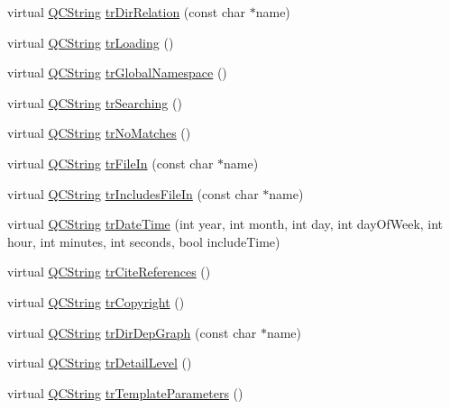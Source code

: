 \begin{DoxyCompactItemize}
\item 
virtual \hyperlink{class_q_c_string}{Q\-C\-String} \hyperlink{class_translator_italian_a38a56cc8bcc5323be9d1f09b0daa5933}{tr\-Dir\-Relation} (const char $\ast$name)
\item 
virtual \hyperlink{class_q_c_string}{Q\-C\-String} \hyperlink{class_translator_italian_aca8cf7409bceb9f8e6af47f637da5457}{tr\-Loading} ()
\item 
virtual \hyperlink{class_q_c_string}{Q\-C\-String} \hyperlink{class_translator_italian_aa9fd39641e570165be20c71c67481fee}{tr\-Global\-Namespace} ()
\item 
virtual \hyperlink{class_q_c_string}{Q\-C\-String} \hyperlink{class_translator_italian_aea79f5912e787bbb2c441223ccd382c6}{tr\-Searching} ()
\item 
virtual \hyperlink{class_q_c_string}{Q\-C\-String} \hyperlink{class_translator_italian_a240e49b617153456e0f29bef561cc10f}{tr\-No\-Matches} ()
\item 
virtual \hyperlink{class_q_c_string}{Q\-C\-String} \hyperlink{class_translator_italian_acf964d17bad4c55c393193fe9708575f}{tr\-File\-In} (const char $\ast$name)
\item 
virtual \hyperlink{class_q_c_string}{Q\-C\-String} \hyperlink{class_translator_italian_a53f57c6e2aa0b9dc09bc47b3746d3481}{tr\-Includes\-File\-In} (const char $\ast$name)
\item 
virtual \hyperlink{class_q_c_string}{Q\-C\-String} \hyperlink{class_translator_italian_a19c43671f677ae0445fca1fe7a5f62cc}{tr\-Date\-Time} (int year, int month, int day, int day\-Of\-Week, int hour, int minutes, int seconds, bool include\-Time)
\item 
virtual \hyperlink{class_q_c_string}{Q\-C\-String} \hyperlink{class_translator_italian_ae43b2c6dbb1637144e32cd13a0d4704c}{tr\-Cite\-References} ()
\item 
virtual \hyperlink{class_q_c_string}{Q\-C\-String} \hyperlink{class_translator_italian_a840474c30dfc2d4e92d1a29c5d1bf343}{tr\-Copyright} ()
\item 
virtual \hyperlink{class_q_c_string}{Q\-C\-String} \hyperlink{class_translator_italian_abbe522be6eed72f54409458a1896323c}{tr\-Dir\-Dep\-Graph} (const char $\ast$name)
\item 
virtual \hyperlink{class_q_c_string}{Q\-C\-String} \hyperlink{class_translator_italian_a138b581235bf64a0338ed25ee0d1ad61}{tr\-Detail\-Level} ()
\item 
virtual \hyperlink{class_q_c_string}{Q\-C\-String} \hyperlink{class_translator_italian_ad9599164391093757c91bbe746f694a5}{tr\-Template\-Parameters} ()

\end{DoxyCompactItemize}
